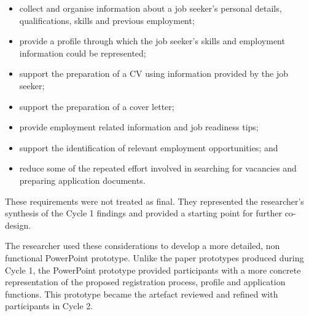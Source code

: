 \begin{itemize}
    \item collect and organise information about a job seeker's personal details, qualifications, skills and previous employment;
    
    \item provide a profile through which the job seeker's skills and employment information could be represented;
    
    \item support the preparation of a CV using information provided by the job seeker;
    
    \item support the preparation of a cover letter;
    
    \item provide employment related information and job readiness tips;
    
    \item support the identification of relevant employment opportunities; and
    
    \item reduce some of the repeated effort involved in searching for vacancies and preparing application documents.
\end{itemize}

These requirements were not treated as final. They represented the researcher's synthesis of the Cycle 1 findings and provided a starting point for further co-design.

The researcher used these considerations to develop a more detailed, non functional PowerPoint prototype. Unlike the paper prototypes produced during Cycle 1, the PowerPoint prototype provided participants with a more concrete representation of the proposed registration process, profile and application functions. This prototype became the artefact reviewed and refined with participants in Cycle 2.